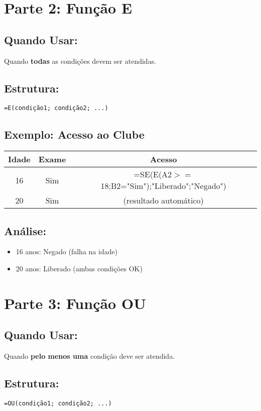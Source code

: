 \documentclass[11pt]{article}
\begin{document}
\section*{Parte 2: Função E}

\subsection*{Quando Usar:}
Quando \textbf{todas} as condições devem ser atendidas.

\subsection*{Estrutura:}
\begin{verbatim}
=E(condição1; condição2; ...)
\end{verbatim}

\subsection*{Exemplo: Acesso ao Clube}
\begin{tabular}{|c|c|c|}
\hline
Idade & Exame & Acesso \\
\hline
16 & Sim & =SE(E(A2$>=$18;B2="Sim");"Liberado";"Negado") \\
\hline
20 & Sim & (resultado automático) \\
\hline
\end{tabular}

\subsection*{Análise:}
\begin{itemize}
\item 16 anos: Negado (falha na idade)
\item 20 anos: Liberado (ambas condições OK)
\end{itemize}


\section*{Parte 3: Função OU}

\subsection*{Quando Usar:}
Quando \textbf{pelo menos uma} condição deve ser atendida.

\subsection*{Estrutura:}
\begin{verbatim}
=OU(condição1; condição2; ...)
\end{verbatim}
\end{document}
